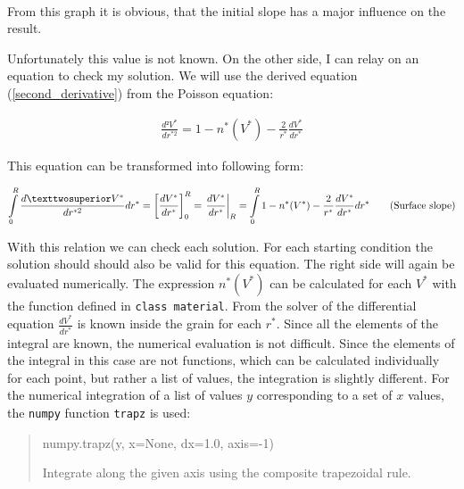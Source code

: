 \documentclass[11pt]{article}
\begin{document}
    \begin{center}
    \end{center}
    { \hspace*{\fill} \\}
    
    From this graph it is obvious, that the initial slope has a major
influence on the result.

Unfortunately this value is not known. On the other side, I can relay on
an equation to check my solution. We will use the derived equation
(\ref{second_derivative}) from the Poisson equation:

\begin{align}
\frac{d²V^{*}}{dr^{*2}}=1-n^{*}(V^{*})-\frac{2}{r^{*}}\frac{dV^{*}}{dr^{*}}
\end{align}

This equation can be transformed into following form:

\begin{align}
\intop_{0}^{R}\frac{d²V^{*}}{dr^{*2}}dr^*=\left[\frac{dV^{*}}{dr^{*}}\right]_{0}^{R}=\left.\frac{dV^*}{dr^{*}}\right|_{R}=\intop_{0}^{R}1-n^{*}(V^{*})-\frac{2}{r^{*}}\frac{dV^{*}}{dr^{*}}dr^*\label{second_derivative}\tag{Surface slope}
\end{align}

With this relation we can check each solution. For each starting
condition the solution should should also be valid for this equation.
The right side will again be evaluated numerically. The expression
\(n^{*}(V^{*})\) can be calculated for each \(V^{*}\) with the function
defined in \texttt{class\ material}. From the solver of the differential
equation \(\frac{dV^*}{dr^{*}}\) is known inside the grain for each
\(r^*\). Since all the elements of the integral are known, the numerical
evaluation is not difficult. Since the elements of the integral in this
case are not functions, which can be calculated individually for each
point, but rather a list of values, the integration is slightly
different. For the numerical integration of a list of values \(y\)
corresponding to a set of \(x\) values, the \texttt{numpy} function
\texttt{trapz} is used:

\begin{quote}
numpy.trapz(y, x=None, dx=1.0, axis=-1)

Integrate along the given axis using the composite trapezoidal rule.
\end{quote}
\end{document}
